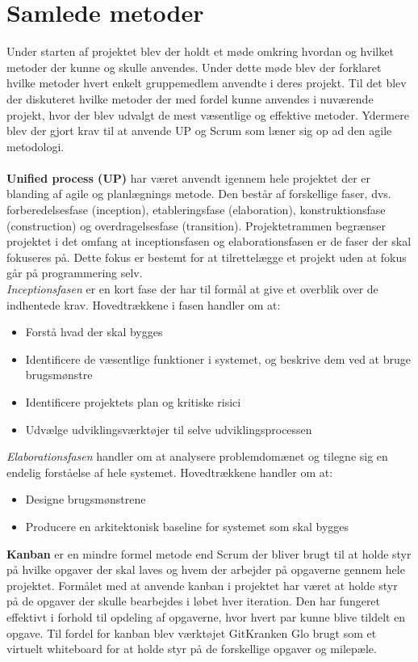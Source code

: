 \section{Samlede metoder} \label{sec:samlede metoder}
Under starten af projektet blev der holdt et møde omkring hvordan og hvilket metoder der kunne og skulle anvendes. Under dette møde blev der forklaret hvilke metoder hvert enkelt gruppemedlem anvendte i deres projekt. Til det blev der diskuteret hvilke metoder der med fordel kunne anvendes i nuværende projekt, hvor der blev udvalgt de mest væsentlige og effektive metoder. Ydermere blev der gjort krav til at anvende UP og Scrum som læner sig op ad den agile metodologi.  \\ \\
\textbf{ Unified process (UP)} har været anvendt igennem hele projektet der er blanding af agile og planlægnings metode. Den består af forskellige faser, dvs. forberedelsesfase (inception), etableringsfase (elaboration), konstruktionsfase (construction) og overdragelsesfase (transition). Projektetrammen begrænser projektet i det omfang at inceptionsfasen og elaborationsfasen er de faser der skal fokuseres på. Dette fokus er bestemt for at tilrettelægge et projekt uden at fokus går på programmering selv. \\ 
\emph{Inceptionsfasen} er en kort fase der har til formål at give et overblik over de indhentede krav. Hovedtrækkene i fasen handler om at:\\
\begin{itemize}
\item Forstå hvad der skal bygges
\item Identificere de væsentlige funktioner i systemet, og beskrive dem ved at bruge brugsmønstre
\item Identificere projektets plan og kritiske risici
\item Udvælge udviklingsværktøjer til selve udviklingsprocessen
\end{itemize}
\emph{Elaborationsfasen} handler om at analysere problemdomænet og tilegne sig en endelig forståelse af hele systemet. Hovedtrækkene handler om at: \\
\begin{itemize}
\item Designe brugsmønstrene
\item Producere en arkitektonisk baseline for systemet som skal bygges
\end{itemize}
\textbf{Kanban} er en mindre formel metode end Scrum der bliver brugt til at holde styr på hvilke opgaver der skal laves og hvem der arbejder på opgaverne gennem hele projektet. Formålet med at anvende kanban i projektet har været at holde styr på de opgaver der skulle bearbejdes i løbet hver iteration. Den har fungeret effektivt i forhold til opdeling af opgaverne, hvor hvert par kunne blive tildelt en opgave. Til fordel for kanban blev værktøjet GitKranken Glo brugt som et virtuelt whiteboard for at holde styr på de forskellige opgaver og milepæle. \\
